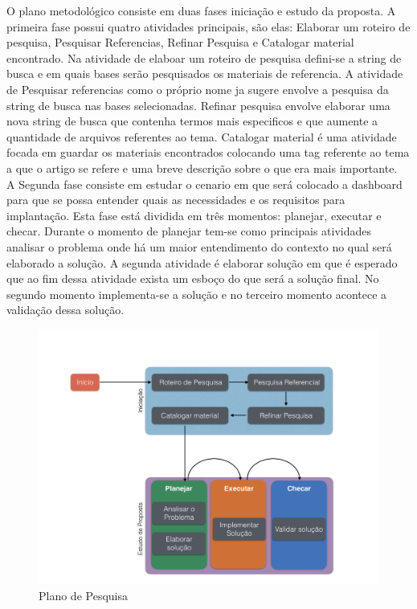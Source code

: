 O plano metodológico consiste em duas fases iniciação e estudo da proposta. A primeira fase possui quatro atividades principais, são elas: Elaborar um roteiro de pesquisa, Pesquisar Referencias, Refinar Pesquisa e Catalogar material encontrado. Na atividade de elaboar um roteiro de pesquisa defini-se a string de busca e em quais bases serão pesquisados os materiais de referencia. A atividade de Pesquisar referencias como o próprio nome ja sugere envolve a pesquisa da string de busca nas bases selecionadas. Refinar pesquisa envolve elaborar uma nova string de busca que contenha termos mais especificos e que aumente a quantidade de arquivos referentes ao tema. Catalogar material é uma atividade focada em guardar os materiais encontrados colocando uma tag referente ao tema a que o artigo se refere e uma breve descrição sobre o que era mais importante. 
\\A Segunda fase consiste em estudar o cenario em que será colocado a dashboard para que se possa entender quais as necessidades e os requisitos para implantação. Esta fase está dividida em três momentos: planejar,  executar e checar. Durante o momento de planejar tem-se como principais atividades analisar o problema onde há um maior entendimento do contexto no qual será elaborado a solução. A segunda atividade é elaborar solução em que é esperado que ao fim dessa atividade exista um esboço do que será a solução final. No segundo momento implementa-se a solução e no terceiro momento acontece a validação dessa solução.
\graphicspath{{figuras/}}
\begin{figure}
\centering
\includegraphics[scale=0.40]{TCCMetodologia}
\caption{Plano de Pesquisa}
\label{Rotulo}
\end{figure}
